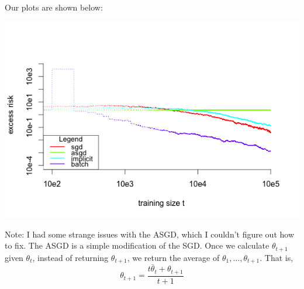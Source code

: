 \documentclass[letterpaper,10pt]{amsart}
\begin{document}
\begin{enumerate}[1.]
\begin{enumerate}[(a)]
\begin{itemize}
\begin{align*}
\end{align*}
\end{itemize}
Our plots are shown below: 
\begin{center}
\includegraphics[scale=0.8]{2bold.png}
\end{center}

Note: I had some strange issues with the ASGD, which I couldn't figure out how to fix. The ASGD is a simple modification of the SGD. Once we calculate $\theta_{t+1}$ given $\theta_t$, instead of returning $\theta_{t+1}$, we return the average of $\theta_1,\ldots,\theta_{t+1}$. That is, 
\[\theta_{t+1} = \frac{t\bar{\theta}_t  + \theta_{t+1}}{t+1} \]


\end{enumerate}
\end{enumerate}
\end{document}
